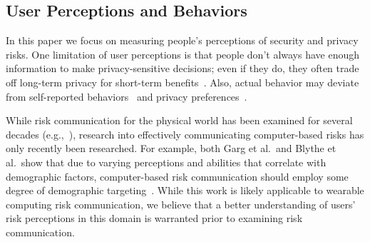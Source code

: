 \subsection{User Perceptions and Behaviors}
In this paper we focus on measuring people's perceptions of security and privacy risks. One limitation of user perceptions is that people don't always have enough information to make privacy-sensitive decisions; even if they do, they often trade off long-term privacy for short-term benefits~\cite{acquisti2005privacy}. Also, actual behavior may deviate from self-reported behaviors~\cite{jensen2005privacy} and privacy preferences~\cite{spiekermann2001privacy}.

While risk communication for the physical world has been examined for several decades (e.g.,~\cite{Fischhoff,Morgan2001}), research into effectively communicating computer-based risks has only recently been researched. For example, both Garg et al.\ and Blythe et al.\ show that due to varying perceptions and abilities that correlate with demographic factors, computer-based risk communication should employ some degree of demographic targeting~\cite{Garg2012,Blythe2011}. While this work is likely applicable to wearable computing risk communication, we believe that a better understanding of users' risk perceptions in this domain is warranted prior to examining risk communication.